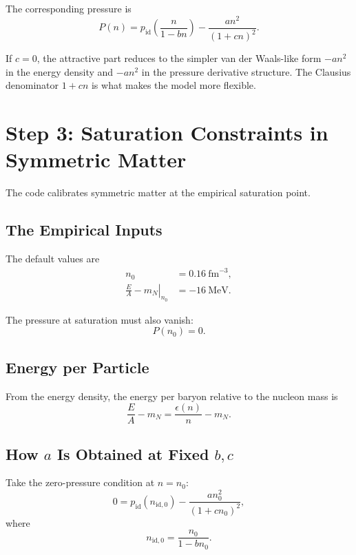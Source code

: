 \documentclass[11pt]{article}
\begin{document}
The corresponding pressure is
\begin{equation}
P(n)
=
p_{\mathrm{id}}\!\left(\frac{n}{1-bn}\right)
-\frac{a n^2}{(1+cn)^2}.
\end{equation}

If $c=0$, the attractive part reduces to the simpler van der Waals-like form
$-a n^2$ in the energy density and $-a n^2$ in the pressure derivative
structure. The Clausius denominator $1+cn$ is what makes the model more
flexible.

\section{Step 3: Saturation Constraints in Symmetric Matter}

The code calibrates symmetric matter at the empirical saturation point.

\subsection{The Empirical Inputs}

The default values are
\begin{align}
n_0 &= 0.16\ \mathrm{fm}^{-3}, \\
\left.\frac{E}{A}-m_N\right|_{n_0} &= -16\ \mathrm{MeV}.
\end{align}

The pressure at saturation must also vanish:
\begin{equation}
P(n_0)=0.
\end{equation}

\subsection{Energy per Particle}

From the energy density, the energy per baryon relative to the nucleon mass is
\begin{equation}
\frac{E}{A}-m_N
=
\frac{\epsilon(n)}{n}-m_N.
\end{equation}

\subsection{How \texorpdfstring{$a$}{a} Is Obtained at Fixed \texorpdfstring{$b,c$}{b,c}}

Take the zero-pressure condition at $n=n_0$:
\begin{equation}
0
=
p_{\mathrm{id}}(n_{\mathrm{id},0})
-\frac{a n_0^2}{(1+cn_0)^2},
\end{equation}
where
\begin{equation}
n_{\mathrm{id},0}=\frac{n_0}{1-bn_0}.
\end{equation}
\end{document}
